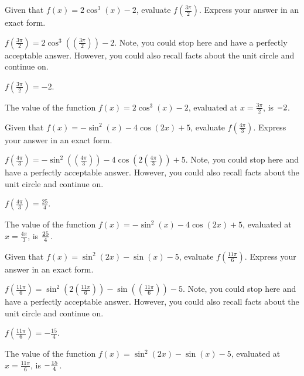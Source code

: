 \begin{shuffle}
\begin{exercise}
Given that $f(x)=2 \cos ^3(x)-2$, evaluate $f\left(\frac{3 \pi }{2}\right)$. Express your answer in an exact form.
\begin{solution}
\begin{hint}
$f\left(\frac{3 \pi }{2}\right)=2 \cos ^3(\left(\frac{3 \pi }{2}\right))-2$. Note, you could stop here and have a perfectly acceptable answer. However, you could also recall facts about the unit circle and continue on. 
\end{hint}
\begin{hint}
$f\left(\frac{3 \pi }{2}\right)=-2$.
\end{hint}
The value of the function $f(x) = 2 \cos ^3(x)-2$, evaluated at $x=\frac{3 \pi }{2}$, is ${-2}$.
\end{solution}
\end{exercise}

\begin{exercise}
Given that $f(x)=-\sin ^2(x)-4 \cos (2 x)+5$, evaluate $f\left(\frac{4 \pi }{3}\right)$. Express your answer in an exact form.
\begin{solution}
\begin{hint}
$f\left(\frac{4 \pi }{3}\right)=-\sin ^2(\left(\frac{4 \pi }{3}\right))-4 \cos (2 \left(\frac{4 \pi }{3}\right))+5$. Note, you could stop here and have a perfectly acceptable answer. However, you could also recall facts about the unit circle and continue on. 
\end{hint}
\begin{hint}
$f\left(\frac{4 \pi }{3}\right)=\frac{25}{4}$.
\end{hint}
The value of the function $f(x) = -\sin ^2(x)-4 \cos (2 x)+5$, evaluated at $x=\frac{4 \pi }{3}$, is ${\frac{25}{4}}$.
\end{solution}
\end{exercise}

\begin{exercise}
Given that $f(x)=\sin ^2(2 x)-\sin (x)-5$, evaluate $f\left(\frac{11 \pi }{6}\right)$. Express your answer in an exact form.
\begin{solution}
\begin{hint}
$f\left(\frac{11 \pi }{6}\right)=\sin ^2(2 \left(\frac{11 \pi }{6}\right))-\sin (\left(\frac{11 \pi }{6}\right))-5$. Note, you could stop here and have a perfectly acceptable answer. However, you could also recall facts about the unit circle and continue on. 
\end{hint}
\begin{hint}
$f\left(\frac{11 \pi }{6}\right)=-\frac{15}{4}$.
\end{hint}
The value of the function $f(x) = \sin ^2(2 x)-\sin (x)-5$, evaluated at $x=\frac{11 \pi }{6}$, is ${-\frac{15}{4}}$.
\end{solution}
\end{exercise}


\end{shuffle}
